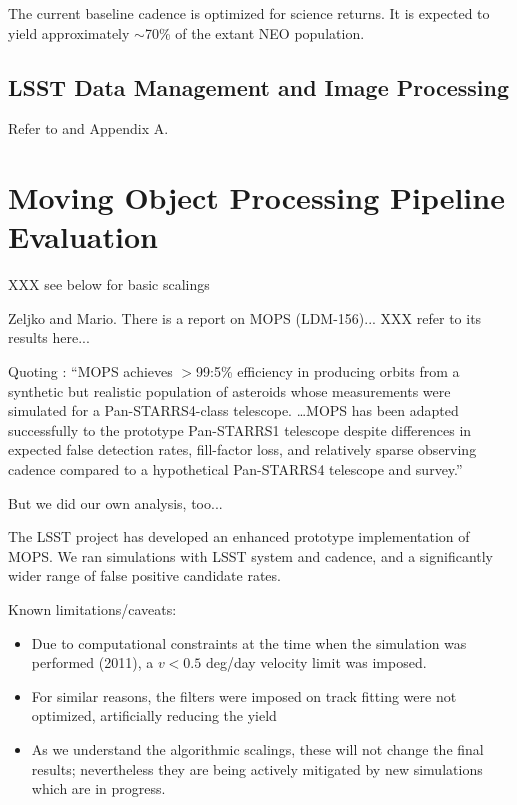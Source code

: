 \documentclass[12pt,preprint]{aastex}
\begin{document}
The current baseline cadence is optimized for science returns.
It is expected to yield approximately $\sim$70\% of the extant NEO population.


\subsection{LSST  Data Management and Image Processing} 

Refer to \cite{DM2016} and Appendix A. 






\section{Moving Object Processing Pipeline Evaluation}

XXX see below for basic scalings 

Zeljko and Mario. There is a report on MOPS (LDM-156)...   XXX refer to its
results here... 

Quoting \cite{denneau13}: ``MOPS achieves $>$99:5\% efficiency in
producing orbits from a synthetic
but realistic population of asteroids whose measurements were
simulated for a Pan-STARRS4-class telescope. \dots MOPS has been
adapted successfully to the prototype Pan-STARRS1 telescope despite
differences in expected false detection rates, fill-factor loss, and
relatively sparse observing cadence compared to a hypothetical
Pan-STARRS4 telescope and survey.'' 

But we did our own analysis, too...

The LSST project has developed an enhanced prototype implementation of MOPS.
We ran simulations with LSST system and cadence, and a significantly
wider range of false positive candidate rates. 

Known limitations/caveats:
\begin{itemize}
\item Due to computational constraints at the time when the simulation
  was performed (2011), a $v < 0.5$ deg/day velocity limit was
  imposed.
\item For similar reasons, the filters were imposed on track fitting
  were not optimized, artificially reducing the yield
\item As we understand the algorithmic scalings, these will not change the
final results; nevertheless they are being actively mitigated by new
simulations which are in progress.
\end{itemize}
\end{document}
